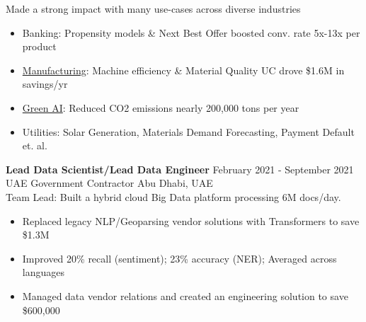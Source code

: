 \documentclass[margin, line]{res} %
\begin{document}
\begin{resume}
Made a strong impact with many use-cases across diverse industries
\begin{itemize} \itemsep -2pt
\item Banking: Propensity models \& Next Best Offer boosted conv. rate 5x-13x per product
\item \href{https://www.datarobot.com/customers/oyak/}{Manufacturing}: Machine efficiency \& Material Quality UC drove \$1.6M in savings/yr
\item \href{https://www.datarobot.com/wp-content/uploads/2022/01/DataRobot_CustomerSuccessStory_OYAK.pdf}{Green AI}: Reduced CO2 emissions nearly 200,000 tons per year
\item Utilities: Solar Generation, Materials Demand Forecasting, Payment Default et. al.
\end{itemize}

{\textbf{Lead Data Scientist/Lead Data Engineer}} \hfill February 2021 - September 2021\\
UAE Government Contractor \hfill Abu Dhabi, UAE\\
Team Lead: Built a hybrid cloud Big Data platform processing 6M docs/day.
\begin{itemize} \itemsep -2pt %
\item Replaced legacy NLP/Geoparsing vendor solutions with Transformers to save \$1.3M
\item Improved 20\% recall (sentiment); 23\% accuracy (NER); Averaged across languages
\item Managed data vendor relations and created an engineering solution to save \$600,000
\end{itemize}


\end{resume}
\end{document}
